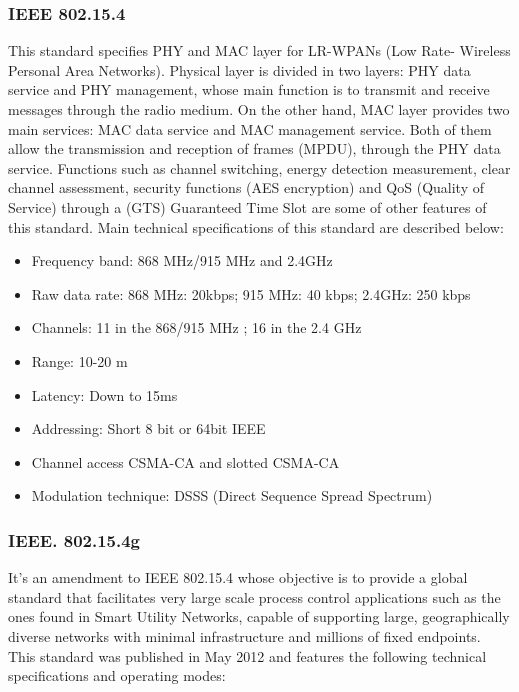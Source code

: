 \documentclass[11pt,draftclsnofoot,onecolumn]{IEEEtran}
\begin{document}
\subsubsection{IEEE 802.15.4}

This standard specifies PHY and MAC layer for LR-WPANs (Low Rate- Wireless Personal Area Networks). Physical layer is divided in two layers: PHY data service and PHY management, whose main function is to transmit and receive messages through the radio medium. On the other hand, MAC layer provides two main services: MAC data service and MAC management service. Both of them allow the transmission and reception of frames (MPDU), through the PHY data service. Functions such as channel switching, energy detection measurement, clear channel assessment, security functions (AES encryption) and QoS (Quality of Service) through a (GTS) Guaranteed Time Slot are some of other features of this standard.  Main technical specifications of this standard are described below:

\begin{itemize}
	\item Frequency band: 868 MHz/915 MHz and 2.4GHz
	\item Raw data rate: 868 MHz: 20kbps; 915 MHz: 40 kbps; 2.4GHz: 250 kbps
	\item Channels: 11 in the 868/915 MHz ; 16 in the 2.4 GHz
	\item Range: 10-20 m
	\item Latency: Down to 15ms
	\item Addressing: Short  8 bit or 64bit IEEE
	\item Channel access CSMA-CA and slotted CSMA-CA
	\item Modulation technique: DSSS (Direct Sequence Spread Spectrum)
\end{itemize}

\subsubsection{IEEE. 802.15.4g}

It’s an amendment to IEEE 802.15.4 whose objective is to provide a global standard that facilitates very large scale process control applications such as the ones found in Smart Utility Networks, capable of supporting large, geographically diverse networks with minimal infrastructure and millions of fixed endpoints. This standard was published in May 2012 and features the following technical specifications and operating modes:
\end{document}

